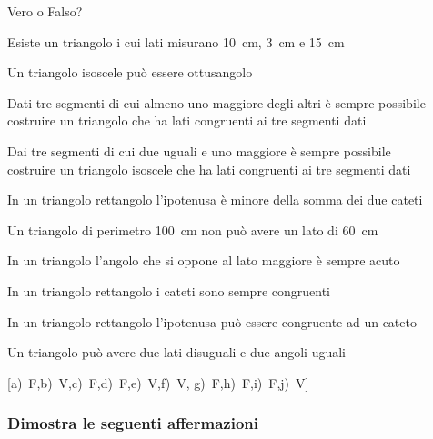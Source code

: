\begin{esercizio}
\label{ese:3.82}
Vero o Falso? 
\vspace{-6pt}
\begin{enumeratea}
\item Esiste un triangolo i cui lati misurano 10~cm, 3~cm e 15~cm
\hfill\boxV\quad\boxF
\item Un triangolo isoscele può essere ottusangolo
\hfill\boxV\quad\boxF
\item Dati tre segmenti di cui almeno uno maggiore degli altri è 
sempre possibile \\
costruire un triangolo che ha lati congruenti ai tre segmenti dati
\hfill\boxV\quad\boxF
\item Dai tre segmenti di cui due uguali e uno maggiore è sempre possibile \\
costruire un triangolo isoscele che ha lati congruenti ai tre segmenti dati
\hfill\boxV\quad\boxF
\item In un triangolo rettangolo l'ipotenusa è minore della somma dei 
due cateti
\hfill\boxV\quad\boxF
\item Un triangolo di perimetro 100~cm non può avere un lato di 60~cm
\hfill\boxV\quad\boxF
\item In un triangolo l'angolo che si oppone al lato maggiore è 
sempre acuto\hfill\boxV\quad\boxF
\item In un triangolo rettangolo i cateti sono sempre congruenti
\hfill\boxV\quad\boxF
\item In un triangolo rettangolo l'ipotenusa può essere congruente ad 
un cateto
\hfill\boxV\quad\boxF
\item Un triangolo può avere due lati disuguali e due angoli uguali
\hfill\boxV\quad\boxF
\end{enumeratea}
\hfill [a)~F,\quad b)~V,\quad c)~F,\quad d)~F,\quad e)~V,\quad f)~V,\quad 
g)~F,\quad h)~F,\quad i)~F,\quad j)~V]
\end{esercizio}

\subsubsection*{Dimostra le seguenti affermazioni}

